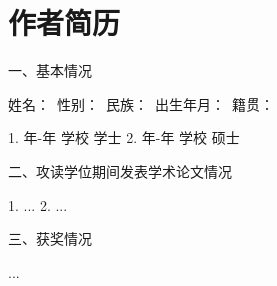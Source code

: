 


\chapter*{作者简历}

一、基本情况

姓名：\ 性别：\ 民族：\ 出生年月：\ 籍贯：

1. 年-年 学校 学士
2. 年-年 学校 硕士

二、攻读学位期间发表学术论文情况

1. ...
2. ...

三、获奖情况

...

